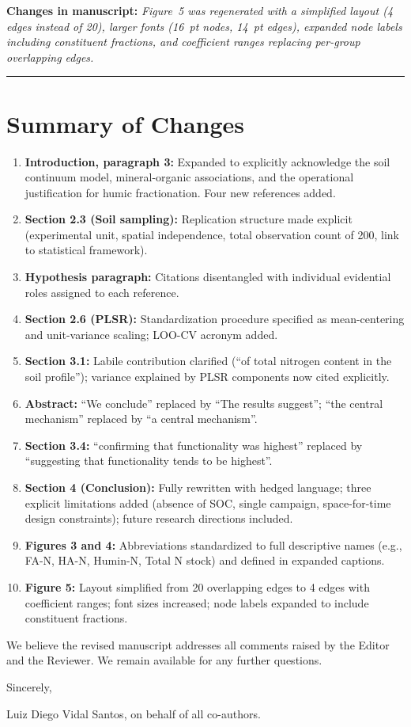 \documentclass[11pt,a4paper]{article}
\newcommand{\change}[1]{\par\noindent\textcolor{changecolor}{\textbf{Changes in manuscript:}} \textit{#1}}
\begin{document}
\change{Figure~5 was regenerated with a simplified layout (4 edges instead of 20), larger fonts (16~pt nodes, 14~pt edges), expanded node labels including constituent fractions, and coefficient ranges replacing per-group overlapping edges.}

\bigskip
\hrule
\bigskip

\section*{Summary of Changes}

\begin{enumerate}[leftmargin=*]
\item \textbf{Introduction, paragraph 3:} Expanded to explicitly acknowledge the soil continuum model, mineral-organic associations, and the operational justification for humic fractionation. Four new references added.
\item \textbf{Section 2.3 (Soil sampling):} Replication structure made explicit (experimental unit, spatial independence, total observation count of 200, link to statistical framework).
\item \textbf{Hypothesis paragraph:} Citations disentangled with individual evidential roles assigned to each reference.
\item \textbf{Section 2.6 (PLSR):} Standardization procedure specified as mean-centering and unit-variance scaling; LOO-CV acronym added.
\item \textbf{Section 3.1:} Labile contribution clarified (``of total nitrogen content in the soil profile''); variance explained by PLSR components now cited explicitly.
\item \textbf{Abstract:} ``We conclude'' replaced by ``The results suggest''; ``the central mechanism'' replaced by ``a central mechanism''.
\item \textbf{Section 3.4:} ``confirming that functionality was highest'' replaced by ``suggesting that functionality tends to be highest''.
\item \textbf{Section 4 (Conclusion):} Fully rewritten with hedged language; three explicit limitations added (absence of SOC, single campaign, space-for-time design constraints); future research directions included.
\item \textbf{Figures 3 and 4:} Abbreviations standardized to full descriptive names (e.g., FA-N, HA-N, Humin-N, Total N stock) and defined in expanded captions.
\item \textbf{Figure 5:} Layout simplified from 20 overlapping edges to 4 edges with coefficient ranges; font sizes increased; node labels expanded to include constituent fractions.
\end{enumerate}

\bigskip
\noindent We believe the revised manuscript addresses all comments raised by the Editor and the Reviewer. We remain available for any further questions.

\bigskip
\noindent Sincerely,

\medskip
\noindent Luiz Diego Vidal Santos, on behalf of all co-authors.
\end{document}
